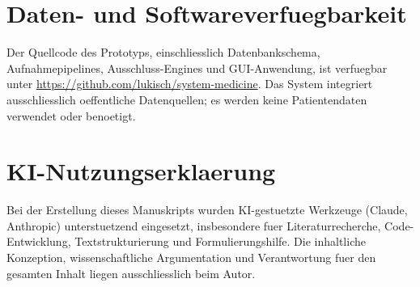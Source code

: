 \documentclass[12pt,a4paper]{article}
\begin{document}
\section*{Daten- und Softwareverfuegbarkeit}

Der Quellcode des Prototyps, einschliesslich Datenbankschema, Aufnahmepipelines, Ausschluss-Engines und GUI-Anwendung, ist verfuegbar unter \url{https://github.com/lukisch/system-medicine}. Das System integriert ausschliesslich oeffentliche Datenquellen; es werden keine Patientendaten verwendet oder benoetigt.

\section*{KI-Nutzungserklaerung}

Bei der Erstellung dieses Manuskripts wurden KI-gestuetzte Werkzeuge
(Claude, Anthropic) unterstuetzend eingesetzt, insbesondere fuer
Literaturrecherche, Code-Entwicklung, Textstrukturierung und Formulierungshilfe.
Die inhaltliche Konzeption, wissenschaftliche Argumentation und
Verantwortung fuer den gesamten Inhalt liegen ausschliesslich beim Autor.



\end{document}
